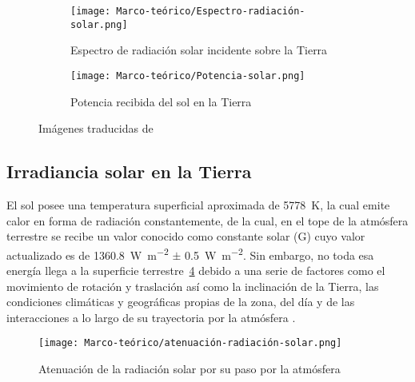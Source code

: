 		\begin{figure}[H]
			\centering
			\begin{subfigure}{\linewidth}
				\centering
				\texttt{[image: Marco-teórico/Espectro-radiación-solar.png]}
				\caption{Espectro de radiación solar incidente sobre la Tierra}
				\label{fig:Espectro-radiación-solar}
			\end{subfigure}
			\begin{subfigure}{\linewidth}
				\centering
				\texttt{[image: Marco-teórico/Potencia-solar.png]}
				\caption{Potencia recibida del sol en la Tierra}
				\label{fig:Potencia-solar}
			\end{subfigure}
			\caption{Imágenes traducidas de \cite{weinstein_spectral_nodate}}
			\label{fig:solar-spectrum-brilliant}
		\end{figure}
		
		
	
	\subsection{Irradiancia solar en la Tierra}
	
		El sol posee una temperatura superficial aproximada de \SI{5778}{\kelvin}, la cual emite calor en forma de radiación constantemente, de la cual, en el tope de la atmósfera terrestre se recibe un valor conocido como constante solar (\gls{G}) cuyo valor actualizado es de \SI{1360.8}{\watt\per\m\tothe{2}} $\pm$ \SI{0.5}{\watt\per\m\tothe{2}}. Sin embargo, no toda esa energía llega a la superficie terrestre~\cref{fig:atenuación-radiación-solar} debido a una serie de factores como el movimiento de rotación y traslación así como la inclinación de la Tierra, las condiciones climáticas y geográficas propias de la zona, del día  y de las interacciones a lo largo de su trayectoria por la atmósfera \cite{garcia_valladares_aplicaciones_2017}.
		
		\begin{figure}[H]
			\centering
			\texttt{[image: Marco-teórico/atenuación-radiación-solar.png]}
			\caption{Atenuación de la radiación solar por su paso por la atmósfera}
			\label{fig:atenuación-radiación-solar}
		\end{figure}
		
		
		
		
	
		
		
		